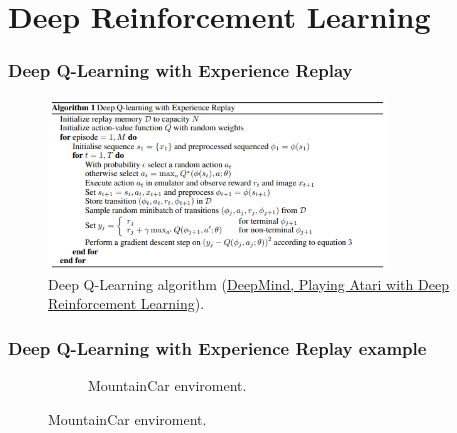 \documentclass{beamer}
\begin{document}
    \section{Deep Reinforcement Learning}

        \begin{frame}
            \frametitle{Deep Q-Learning with Experience Replay}
            \begin{figure}
                \centering
                \includegraphics[width=0.8\textwidth]{figures/deep_q_learning}
                \caption{Deep Q-Learning algorithm (\href{https://arxiv.org/pdf/1312.5602v1.pdf}{DeepMind, Playing Atari with Deep Reinforcement Learning}).}
                \label{fig9:deep-q}
            \end{figure}
        \end{frame}

        \begin{frame}
            \frametitle{Deep Q-Learning with Experience Replay example}
        
            \begin{figure}[]
                \begin{figure}
                    \centering
                    \label{fig10:mountain2}
                    \caption{MountainCar enviroment.}
                \end{figure}
            \end{figure}
        
        \end{frame}
\end{document}
